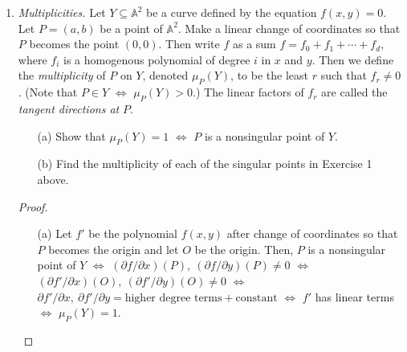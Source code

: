 \documentclass[12pt]{article}
\newcommand{\A}{\mathbb{A}}
\theoremstyle{definition}
\begin{document}
\begin{enumerate} [label=\textbf{\arabic*.}, leftmargin=-0.05em]
\begin{proof} $ $ \vspace{0pt}
    \begin{center}
        \renewcommand{\arraystretch}{1.5}
        \begin{tabular}{c|c|c|c|c}
             $f$ & $\partial f / \partial x$ & $\partial f / \partial y$ & $\partial f / \partial z$ & $\text{Sing}~f$ \\ \hline
            $xy^2 - z^2$ & $y^2$ & $2xy$ & $-2z$ & $(t, 0, 0), ~ t \in k$ \\ \hline
            $x^2+y^2-z^2$ & $2x$ & $2y$ & $-2z$ & $(0, 0, 0)$ \\ \hline
            $x^3+y^3+xy$ & $3x^2 + y$ & $3y^2 + x$ & $0$ & $(0, 0, t), ~ t \in k$
        \end{tabular}
    \end{center}
    (a) is the pinch point, (b) is the conical double point, and (c) is the double line.
\end{proof}

\item \textit{Multiplicities.} Let $Y \subseteq \A^2$ be a curve defined by the equation $f(x, y) = 0$. Let $P = (a, b)$ be a point of $\A^2$. Make a linear change of coordinates so that $P$ becomes the point $(0, 0)$. Then write $f$ as a sum $f = f_0 + f_1 + \cdots + f_d$, where $f_i$ is a homogenous polynomial of degree $i$ in $x$ and $y$. Then we define the \textit{multiplicity} of $P$ on $Y$, denoted $\mu_P(Y)$, to be the least $r$ such that $f_r \neq 0$. (Note that $P \in Y$ $\iff$ $\mu_P(Y) > 0$.) The linear factors of $f_r$ are called the \textit{tangent directions at} $P$.
\begin{itemize}
    \item[(a)] Show that $\mu_P(Y) = 1$ $\iff$ $P$ is a nonsingular point of $Y$.
    \item[(b)] Find the multiplicity of each of the singular points in Exercise 1 above.
\end{itemize}

\begin{proof} $ $ \vspace{0pt}
    \begin{itemize}
        \item[(a)] Let $f'$ be the polynomial $f(x, y)$ after change of coordinates so that $P$ becomes the origin and let $O$ be the origin. Then, $P$ is a nonsingular point of $Y$ $\iff$ $(\partial f / \partial x)(P), ~ (\partial f / \partial y)(P) \neq 0$ $\iff$ $(\partial f' / \partial x)(O), ~ (\partial f' / \partial y)(O) \neq 0$ $\iff$ $\partial f' / \partial x, ~ \partial f' / \partial y = \text{higher degree terms} + \text{constant}$ $\iff$ $f'$ has linear terms $\iff$ $\mu_P(Y) = 1$.


\end{itemize}
\end{proof}
\end{enumerate}
\end{document}
